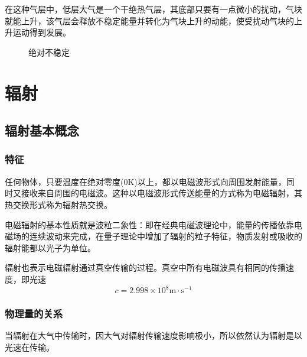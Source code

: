 \documentclass[UTF8,a4paper,11pt,oneside]{ctexbook}
\begin{document}
在这种气层中，低层大气是一个干绝热气层，其底部只要有一点微小的扰动，气块就能上升，该气层会释放不稳定能量并转化为气块上升的动能，使受扰动气块的上升运动得到发展。
\begin{figure}[htbp]
    \centering
    \caption{绝对不稳定}
\end{figure}

\chapter{辐射}

\section{辐射基本概念}

\subsection{特征}

任何物体，只要温度在绝对零度(0K)以上，都以电磁波形式向周围发射能量，同时又接收来自周围的电磁波。这种以电磁波形式传送能量的方式称为电磁辐射，其热交换形式称为辐射热交换。

电磁辐射的基本性质就是波粒二象性：即在经典电磁波理论中，能量的传播依靠电磁场的连续波动来完成，在量子理论中增加了辐射的粒子特征，物质发射或吸收的辐射能都以光子为单位。

辐射也表示电磁辐射通过真空传输的过程。真空中所有电磁波具有相同的传播速度，即光速
\begin{equation}
c=2.998\times10^8\mathrm{m\cdot{}s^{-1}}
\end{equation}

\subsection{物理量的关系}

当辐射在大气中传输时，因大气对辐射传输速度影响极小，所以依然认为辐射是以光速在传输。
\end{document}
